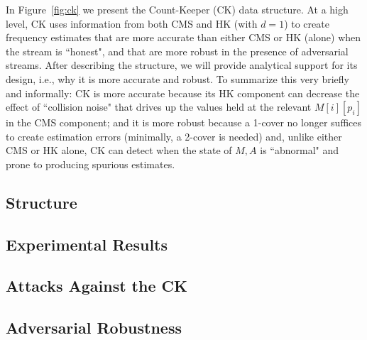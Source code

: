 In Figure~\ref{fig:ck} we present the Count-Keeper (CK) data structure.  At a high level, CK uses information from both CMS and HK (with $d=1$) to create frequency estimates that are more accurate than either CMS or HK (alone) when the stream is ``honest", and that are more robust in the presence of adversarial streams.  After describing the structure, we will provide analytical support for its design, i.e., why it is more accurate and robust.  To summarize this very briefly and informally: CK is more accurate because its HK component can decrease the effect of ``collision noise" that drives up the values held at the relevant $M[i][p_i]$ in the CMS component; and it is more robust because a 1-cover no longer suffices to create estimation errors (minimally, a 2-cover is needed) and, unlike either CMS or HK alone, CK can detect when the state of $M,A$ is ``abnormal" and prone to producing spurious estimates.

\subsection{Structure}




\subsection{Experimental Results}\label{sub-sec:experiments}


\subsection{Attacks Against the CK}\label{sub-sec:ck-attacks}


\subsection{Adversarial Robustness}\label{sub-sec:ck-flags}
